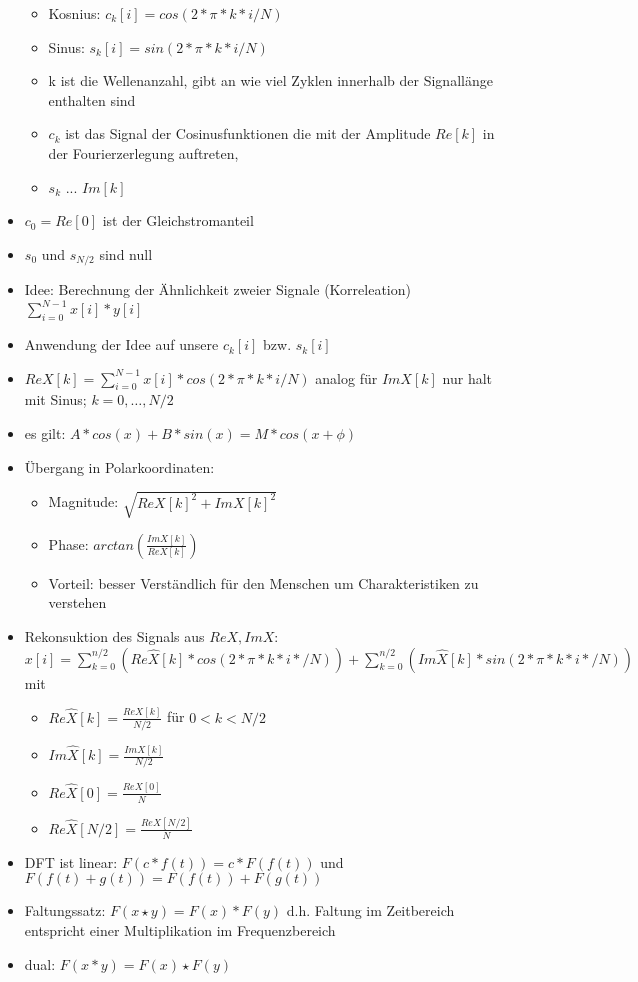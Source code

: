 \documentclass{article} %
\begin{document}
\begin{itemize}
\begin{itemize}
			\item Kosnius: $c_k[i] = cos(2*\pi*k*i/N)$	
			\item Sinus: $s_k[i] = sin(2*\pi*k*i/N)$			
			\item k ist die Wellenanzahl, gibt an wie viel Zyklen innerhalb der Signallänge enthalten sind
			\item $c_k$ ist das Signal der Cosinusfunktionen die mit der Amplitude $Re[k]$ in der Fourierzerlegung auftreten,
			\item $s_k$ ... $Im[k]$ 
		\end{itemize}
		\item $c_0 = Re[0]$ ist der Gleichstromanteil
		\item $s_0$ und $s_{N/2}$ sind null
		\item Idee: Berechnung der Ähnlichkeit zweier Signale (Korreleation) $\sum_{i=0}^{N-1}x[i]*y[i]$
		\item Anwendung der Idee auf unsere $c_k[i]$ bzw. $s_k[i]$
		\item $ReX[k] = \sum_{i=0}^{N-1}x[i]*cos(2*\pi*k*i/N)$ analog für $ImX[k]$ nur halt mit Sinus; $k = 0,\dots,N/2$
		\item es gilt: $A*cos(x)+B*sin(x) = M*cos(x+\phi)$
		\item Übergang in Polarkoordinaten:
		\begin{itemize}
			\item Magnitude: $\sqrt{ReX[k]^2+ImX[k]^2}$
			\item Phase: $arctan(\frac{ImX[k]}{ReX[k]})$
			\item Vorteil: besser Verständlich für den Menschen um Charakteristiken zu verstehen
		\end{itemize}
		\item Rekonsuktion des Signals aus $ReX,ImX$: $x[i] = \sum_{k=0}^{n/2}(Re\hat{X}[k]*cos(2*\pi*k*i*/N))+\sum_{k=0}^{n/2}(Im\hat{X}[k]*sin(2*\pi*k*i*/N))$ mit 
		\begin{itemize}
			\item $Re\hat{X}[k] = \frac{ReX[k]}{N/2}$ für $ 0 < k <N/2$
			\item $Im\hat{X}[k] = \frac{ImX[k]}{N/2}$
			\item $Re\hat{X}[0] = \frac{ReX[0]}{N}$
			\item $Re\hat{X}[N/2] = \frac{ReX[N/2]}{N}$
		\end{itemize}
		\item DFT ist linear: $F(c*f(t)) = c*F(f(t))$ und $F(f(t)+g(t)) = F(f(t))+F(g(t))$
		\item Faltungssatz: $F(x\star y)= F(x)*F(y)$ d.h. Faltung im Zeitbereich entspricht einer Multiplikation im Frequenzbereich
		\item dual: $F(x*y) = F(x)\star F(y)$
	\end{itemize}
\end{document}
